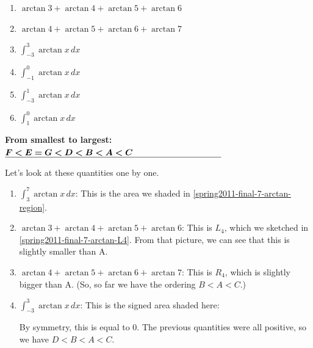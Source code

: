 \documentclass{article}
\begin{document}
\begin{enumerate}
\begin{enumerate}
\begin{enumerate}[label=\Alph*.]
    \item $\displaystyle \arctan 3 + \arctan 4 + \arctan 5 + \arctan 6$

    \item $\displaystyle \arctan 4 + \arctan 5 + \arctan 6 + \arctan 7$

    \item $\displaystyle \int_{-3}^3 \arctan x\,dx$
    \item $\displaystyle \int_{-1}^0 \arctan x\,dx$  
    \item $\displaystyle \int_{-3}^1 \arctan x\,dx$  
    \item $\displaystyle \int_{1}^0 \arctan x\,dx$     
    \end{enumerate}

    \pspace{\vfill}

    \textbf{From smallest to largest:} $\fitb{3.5in}{F < E = G < D < B < A <
      C}$

    \pspace{\newpage}

    \begin{solution}
      Let's look at these quantities one by one. 
      \begin{enumerate}[label=\Alph*.]
      \item $\displaystyle \int_3^{7} \arctan x\,dx$: This is the area we
        shaded in \ref{spring2011-final-7-arctan-region}. 

      \item $\displaystyle \arctan 3 + \arctan 4 + \arctan 5 + \arctan 6$:
        This is $L_4$, which we sketched in
        \ref{spring2011-final-7-arctan-L4}.  From that picture, we can see
        that this is slightly smaller than A.

      \item $\displaystyle \arctan 4 + \arctan 5 + \arctan 6 + \arctan 7$:
        This is $R_4$, which is slightly bigger than A.  (So, so far we have
        the ordering $B < A < C$.)

      \item $\displaystyle \int_{-3}^3 \arctan x\,dx$: This is the signed
        area shaded here:
        \begin{center}
        \end{center}
        By symmetry, this is equal to 0.  The previous quantities were all
        positive, so we have $D < B < A < C$.


\end{enumerate}
\end{solution}
\end{enumerate}
\end{enumerate}
\end{document}
